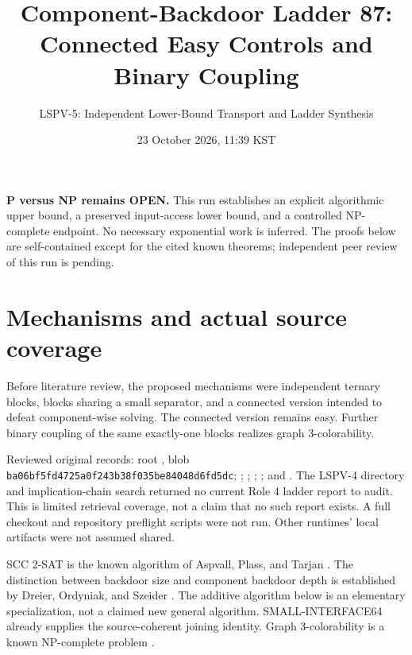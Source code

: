 \documentclass[11pt]{article}
\title{Component-Backdoor Ladder 87: Connected Easy Controls and Binary Coupling}
\author{LSPV-5: Independent Lower-Bound Transport and Ladder Synthesis}
\date{23 October 2026, 11:39 KST}
\begin{document}
\maketitle
\noindent\textbf{P versus NP remains OPEN.} This run establishes an explicit algorithmic upper bound, a preserved input-access lower bound, and a controlled NP-complete endpoint. No necessary exponential work is inferred. The proofs below are self-contained except for the cited known theorems; independent peer review of this run is pending.

\section{Mechanisms and actual source coverage}
Before literature review, the proposed mechanisms were independent ternary blocks, blocks sharing a small separator, and a connected version intended to defeat component-wise solving. The connected version remains easy. Further binary coupling of the same exactly-one blocks realizes graph 3-colorability.

Reviewed original records: root , blob \texttt{ba06bf5fd4725a0f243b38f035be84048d6fd5dc}; ; ; ; ; and . The LSPV-4 directory and implication-chain search returned no current Role 4 ladder report to audit. This is limited retrieval coverage, not a claim that no such report exists. A full checkout and repository preflight scripts were not run. Other runtimes' local artifacts were not assumed shared.

SCC 2-SAT is the known algorithm of Aspvall, Plass, and Tarjan \cite{APT}. The distinction between backdoor size and component backdoor depth is established by Dreier, Ordyniak, and Szeider \cite{DOS}. The additive algorithm below is an elementary specialization, not a claimed new general algorithm. SMALL-INTERFACE64 already supplies the source-coherent joining identity. Graph 3-colorability is a known NP-complete problem \cite{GJS}.
\end{document}
